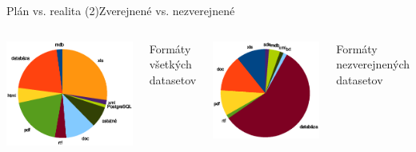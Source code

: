 \documentclass[slovak,14pt,utf8]{beamer}
\begin{document}
\begin{frame}{Plán vs. realita (2)}{Zverejnené vs. nezverejnené}
    \begin{columns}
        \includegraphics[width=\linewidth]{dataset_formaty}

        Formáty všetkých datasetov

        \includegraphics[width=\linewidth]{nezverejnene_formaty}

        Formáty nezverejnených datasetov
    \end{columns}
\end{frame}
\end{document}
